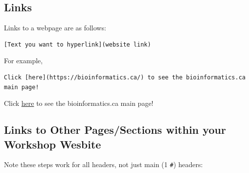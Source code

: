 \documentclass[
]{book}
\theoremstyle{definition}
\theoremstyle{definition}
\theoremstyle{definition}
\theoremstyle{definition}
\theoremstyle{remark}
\begin{document}
\subsection*{Links}\label{links}

Links to a webpage are as follows:

\begin{verbatim}
[Text you want to hyperlink](website link)
\end{verbatim}

For example,

\begin{verbatim}
Click [here](https://bioinformatics.ca/) to see the bioinformatics.ca main page!
\end{verbatim}

Click \href{https://bioinformatics.ca/}{here} to see the bioinformatics.ca main page!

\subsection*{Links to Other Pages/Sections within your Workshop Wesbite}\label{links-to-other-pagessections-within-your-workshop-wesbite}

Note these steps work for all headers, not just main (1 \texttt{\#}) headers:
\end{document}
